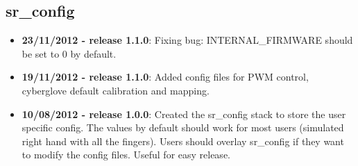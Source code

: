 
\subsection{sr\_config}
\label{sec:sr-config-changelog}

\begin{itemize}
\item \textbf{23/11/2012 - release 1.1.0}: Fixing bug: INTERNAL\_FIRMWARE should be set to 0 by default.
\item \textbf{19/11/2012 - release 1.1.0}: Added config files for PWM control, cyberglove default calibration and mapping.
\item \textbf{10/08/2012 - release 1.0.0}: Created the sr\_config stack to store the user specific config. The values by default should work for most users (simulated right hand with all the fingers). Users should overlay sr\_config if they want to modify the config files. Useful for easy release.
\end{itemize}
